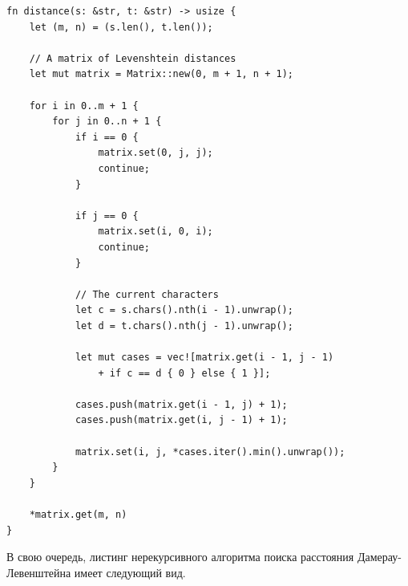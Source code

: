 \documentclass[oneside, a4paper, 12pt]{article}
\begin{document}
\begin{lstlisting}[caption=
    Нерекурсивная реализация алгоритма поиска расстояния
    Левенштейна.
]
fn distance(s: &str, t: &str) -> usize {
    let (m, n) = (s.len(), t.len());

    // A matrix of Levenshtein distances
    let mut matrix = Matrix::new(0, m + 1, n + 1);

    for i in 0..m + 1 {
        for j in 0..n + 1 {
            if i == 0 {
                matrix.set(0, j, j);
                continue;
            }

            if j == 0 {
                matrix.set(i, 0, i);
                continue;
            }

            // The current characters
            let c = s.chars().nth(i - 1).unwrap();
            let d = t.chars().nth(j - 1).unwrap();

            let mut cases = vec![matrix.get(i - 1, j - 1)
                + if c == d { 0 } else { 1 }];

            cases.push(matrix.get(i - 1, j) + 1);
            cases.push(matrix.get(i, j - 1) + 1);

            matrix.set(i, j, *cases.iter().min().unwrap());
        }
    }

    *matrix.get(m, n)
}
\end{lstlisting}

В свою очередь, листинг нерекурсивного алгоритма поиска расстояния
Дамерау-Левенштейна имеет следующий вид.
\end{document}
